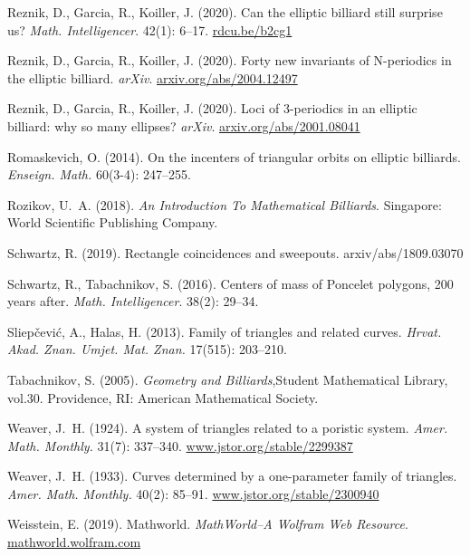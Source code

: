 \begin{thebibliography}{10}
Reznik, D., Garcia, R., Koiller, J. (2020).
\newblock Can the elliptic billiard still surprise us?
\newblock \emph{Math. Intelligencer}. 42(1): 6--17.
\newblock \url{rdcu.be/b2cg1}

Reznik, D., Garcia, R., Koiller, J. (2020).
\newblock Forty new invariants of {N}-periodics in the elliptic billiard.
\newblock \emph{arXiv}.
\newblock \url{arxiv.org/abs/2004.12497}

Reznik, D., Garcia, R., Koiller, J. (2020).
\newblock Loci of 3-periodics in an elliptic billiard: why so many ellipses?
\newblock \emph{arXiv}.
\newblock \url{arxiv.org/abs/2001.08041}

Romaskevich, O. (2014).
\newblock On the incenters of triangular orbits on elliptic billiards.
\newblock \emph{Enseign. Math.} 60(3-4): 247--255.

Rozikov, U.~A. (2018).
\newblock \emph{An Introduction To Mathematical Billiards}.
\newblock Singapore: World Scientific Publishing Company.

Schwartz, R. (2019).
\newblock Rectangle coincidences and sweepouts.
\newblock arxiv/abs/1809.03070

Schwartz, R., Tabachnikov, S. (2016).
\newblock Centers of mass of {P}oncelet polygons, 200 years after.
\newblock \emph{Math. Intelligencer}. 38(2): 29--34.

Sliep\v{c}evi\'c, A., Halas, H. (2013).
\newblock Family of triangles and related curves.
\newblock \emph{
Hrvat. Akad. Znan. Umjet. Mat. Znan.} 17(515): 203--210.

Tabachnikov, S. (2005).
\newblock \emph{Geometry and Billiards},Student Mathematical
  Library, vol.30.
\newblock Providence, RI: American Mathematical Society.

Weaver, J.~H. (1924).
\newblock A system of triangles related to a poristic system.
\newblock \emph{Amer. Math. Monthly.} 31(7): 337--340.
\newblock \url{www.jstor.org/stable/2299387}

Weaver, J.~H. (1933).
\newblock Curves determined by a one-parameter family of triangles.
\newblock \emph{Amer. Math. Monthly.} 40(2): 85--91.
\newblock \url{www.jstor.org/stable/2300940}

Weisstein, E. (2019).
\newblock Mathworld.
\newblock \emph{MathWorld--A Wolfram Web Resource}.
\newblock \url{mathworld.wolfram.com}

\end{thebibliography}
